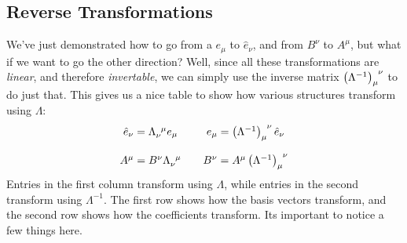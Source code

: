 \subsection{Reverse Transformations}
We've just demonstrated how to go from a $e_\mu$ to $\hat{e}_\nu$, and from $B^\nu$ to $A^\mu$, but what if we want to go the other direction?
Well, since all these transformations are \emph{linear}, and therefore \emph{invertable}, we can simply use the inverse matrix $\tensor{\left(\Lambda^{-1}\right)}{_\mu^\nu}$ to do just that.
This gives us a nice table to show how various structures transform using $\Lambda$:
\[
    \begin{matrix}
        \hat{e}_\nu = \tensor{\Lambda}{_\nu^\mu} e_\mu &  & e_\mu = \tensor{\left(\Lambda^{-1}\right)}{_\mu^\nu}\hat{e}_\nu \\
        & & \\
         A^\mu = B^\nu\tensor{\Lambda}{_\nu^\mu} & & B^\nu = A^\mu \tensor{\left(\Lambda^{-1}\right)}{_\mu^\nu}
    \end{matrix}
\]
Entries in the first column transform using $\Lambda$, while entries in the second transform using $\Lambda^{-1}$.
The first row shows how the basis vectors transform, and the second row shows how the coefficients transform. 
Its important to notice a few things here.
